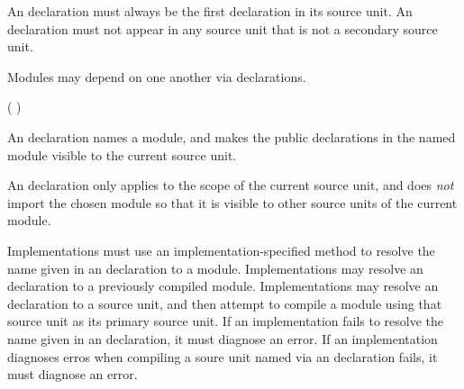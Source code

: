 An  declaration must always be the first declaration in its source unit.
An  declaration must not appear in any source unit that is not a secondary source unit.



Modules may depend on one another via  declarations.

\begin{Syntax}
      ( )\Char{*} \Char{;} \\
  \SynOr  {}  \Char{;}
\end{Syntax}

An  declaration names a module, and makes the public declarations in the named module visible to the current source unit.

\begin{Note} 
An  declaration only applies to the scope of the current source unit, and does \emph{not} import the chosen module so that it is visible to other source units of the current module.
\end{Note}

Implementations must use an implementation-specified method to resolve the name given in an  declaration to a module.
Implementations may resolve an  declaration to a previously compiled module.
Implementations may resolve an  declaration to a source unit, and then attempt to compile a module using that source unit as its primary source unit.
If an implementation fails to resolve the name given in an  declaration, it must diagnose an error.
If an implementation diagnoses erros when compiling a soure unit named via an  declaration fails, it must diagnose an error.

